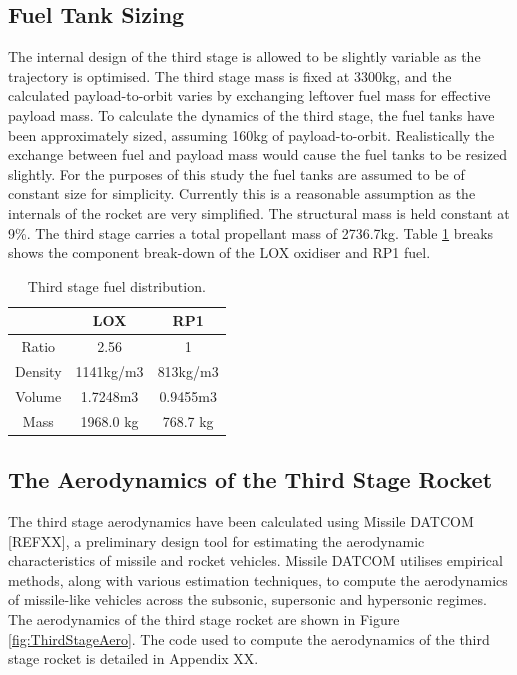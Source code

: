 		\subsection{Fuel Tank Sizing}
		The internal design of the third stage is allowed to be slightly variable as the trajectory is optimised. The third stage mass is fixed at 3300kg, and the calculated payload-to-orbit varies by exchanging leftover fuel mass for effective payload mass. To calculate the dynamics of the third stage, the fuel tanks have been approximately sized, assuming 160kg of payload-to-orbit. Realistically the exchange between fuel and payload mass would cause the fuel tanks to be resized slightly. For the purposes of this study the fuel tanks are assumed to be of constant size for simplicity. Currently this is a reasonable assumption as the internals of the rocket are very simplified. The structural mass is held constant at 9\%. The third stage carries a total propellant mass of 2736.7kg. Table \ref{tab:Fuel} breaks shows the component break-down of the LOX oxidiser and RP1 fuel.  
		
		\begin{table}[h]
			\centering
\begin{tabular}{|c|c|c|}
	\hline  & \textbf{LOX} & \textbf{RP1} \\ 
	\hline Ratio & 2.56 & 1 \\ 
	\hline Density & 1141kg/m3 & 813kg/m3 \cite{Magee}\\ 
	\hline Volume & 1.7248m3 & 0.9455m3 \\ 
	\hline Mass & 1968.0 kg & 768.7 kg \\ 
	\hline 
\end{tabular} 
\caption{Third stage fuel distribution.}
\label{tab:Fuel}
		\end{table}

		
		

		\subsection{The Aerodynamics of the Third Stage Rocket}
		
		The third stage aerodynamics have been calculated using Missile DATCOM [REFXX], a preliminary design tool for estimating the aerodynamic characteristics of missile and rocket vehicles. Missile DATCOM utilises empirical methods, along with various estimation techniques, to compute the aerodynamics of missile-like vehicles across the subsonic, supersonic and hypersonic regimes. The aerodynamics of the third stage rocket are shown in Figure \ref{fig:ThirdStageAero}. The code used to compute the aerodynamics of the third stage rocket is detailed in Appendix XX.  
		
